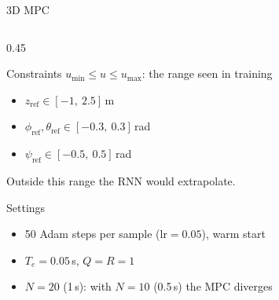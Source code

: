 \begin{frame}{3D MPC}
\begin{columns}[T,onlytextwidth]
        \begin{column}{0.45\textwidth}
            \begin{block}{Constraints}
                \footnotesize
                $u_{\min} \le u \le u_{\max}$: the range seen in training
                \begin{itemize}\setlength{\itemsep}{0pt}
                    \item $z_{\mathrm{ref}} \in [-1,\ 2.5]$\,m
                    \item $\phi_{\mathrm{ref}}, \theta_{\mathrm{ref}}
                    \in [-0.3,\ 0.3]$\,rad
                    \item $\psi_{\mathrm{ref}} \in [-0.5,\ 0.5]$\,rad
                \end{itemize}
                {\scriptsize Outside this range the RNN would extrapolate.\par}
            \end{block}

            \begin{exampleblock}{Settings}
                \footnotesize
                \begin{itemize}\setlength{\itemsep}{0pt}
                    \item 50 Adam steps per sample ($\mathrm{lr}=0.05$),
                    warm start
                    \item $T_e = 0.05$\,s, $Q = R = 1$
                    \item $N=20$ (1\,s): with $N=10$ (0.5\,s) the MPC diverges
                \end{itemize}
            \end{exampleblock}
        \end{column}
    \end{columns}
\end{frame}

